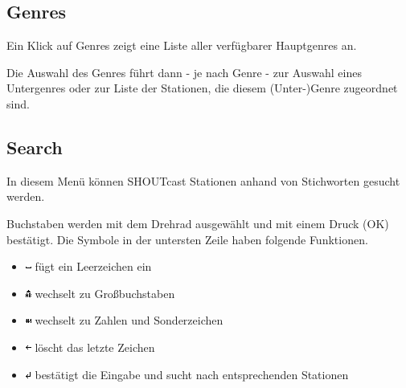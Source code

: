\documentclass[12pt,a4paper,openany]{memoir}
\begin{document}
\subsection{Genres}
Ein Klick auf Genres zeigt eine Liste aller verfügbarer Hauptgenres an. 


Die Auswahl des Genres führt dann - je nach Genre - zur Auswahl eines Untergenres oder zur Liste der Stationen, die diesem (Unter-)Genre zugeordnet sind.



\subsection{Search}
In diesem Menü können SHOUTcast Stationen anhand von Stichworten gesucht werden. 


Buchstaben werden mit dem Drehrad ausgewählt und mit einem Druck (OK) bestätigt. Die Symbole in der untersten Zeile haben folgende Funktionen.
\begin{itemize}
 \item \includegraphics[width=7px]{images/space.png} fügt ein Leerzeichen ein
 \item \includegraphics[width=7px]{images/upper.png} wechselt zu Großbuchstaben
 \item \includegraphics[width=7px]{images/numbers.png} wechselt zu Zahlen und Sonderzeichen
 \item \includegraphics[width=7px]{images/back.png} löscht das letzte Zeichen
 \item \includegraphics[width=7px]{images/enter.png} bestätigt die Eingabe und sucht nach entsprechenden Stationen
\end{itemize}
\end{document}

